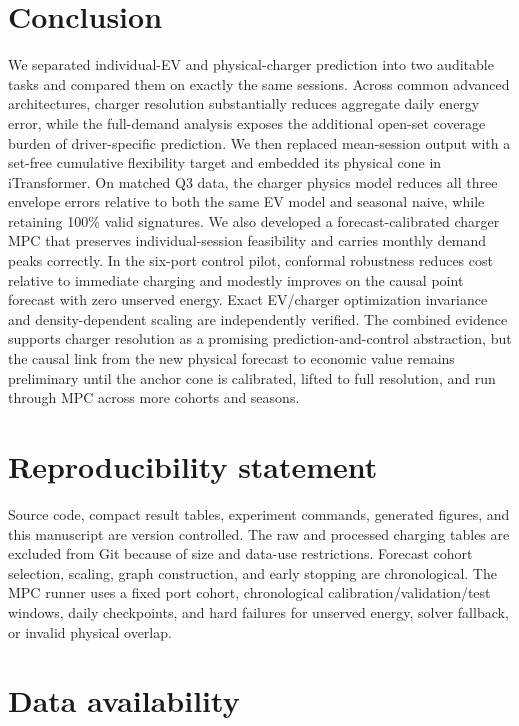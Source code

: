 \documentclass[11pt]{article}
\begin{document}
\section{Conclusion}

We separated individual-EV and physical-charger prediction into two auditable
tasks and compared them on exactly the same sessions.  Across common advanced
architectures, charger resolution substantially reduces aggregate daily energy
error, while the full-demand analysis exposes the additional open-set coverage
burden of driver-specific prediction.  We then replaced mean-session output
with a set-free cumulative flexibility target and embedded its physical cone
in iTransformer.  On matched Q3 data, the charger physics model reduces all
three envelope errors relative to both the same EV model and seasonal naive,
while retaining 100\% valid signatures.  We also developed a forecast-calibrated
charger MPC that preserves individual-session feasibility and carries monthly
demand peaks correctly.  In the six-port control pilot, conformal robustness
reduces cost relative to immediate charging and modestly improves on the
causal point forecast with zero unserved energy.  Exact EV/charger optimization
invariance and density-dependent scaling are independently verified.  The
combined evidence supports charger resolution as a promising
prediction-and-control abstraction, but the causal link from the new physical
forecast to economic value remains preliminary until the anchor cone is
calibrated, lifted to full resolution, and run through MPC across more cohorts
and seasons.

\section*{Reproducibility statement}

Source code, compact result tables, experiment commands, generated figures, and
this manuscript are version controlled.  The raw and processed charging tables
are excluded from Git because of size and data-use restrictions.  Forecast
cohort selection, scaling, graph construction, and early stopping are
chronological.  The MPC runner uses a fixed port cohort, chronological
calibration/validation/test windows, daily checkpoints, and hard failures for
unserved energy, solver fallback, or invalid physical overlap.

\section*{Data availability}
\end{document}
